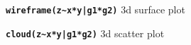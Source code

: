 \documentclass[8pt,landscape]{article}
\newcommand{\code}{\texttt}
\newcommand{\bcode}[1]{\texttt{\textbf{#1}}}
\begin{document}
\begin{multicols*}{3}
\bcode{wireframe(z\~{}x*y|g1*g2)}  3d surface plot

\bcode{cloud(z\~{}x*y|g1*g2)}  3d scatter plot











\end{multicols*}
\end{document}
